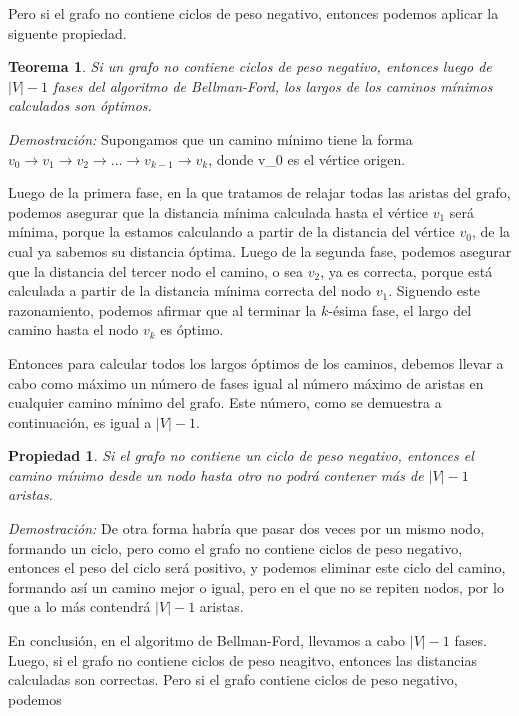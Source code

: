 \documentclass[a4paper, 10pt]{article}
\newcounter{theoremCounter}
\numberwithin{theoremCounter}{subsection}
\numberwithin{problemCounter}{subsection}
\numberwithin{defCounter}{subsection}
\numberwithin{obsCounter}{subsection}
\numberwithin{methCounter}{subsection}
\numberwithin{exampleCounter}{subsection}
\newcounter{propCounter}
\numberwithin{propCounter}{subsection}
\theoremstyle{violetnumbox}
\newtheorem{theoremeT}[theoremCounter]{Teorema}
\theoremstyle{blacknumex}
\newtheorem{propertyT}[propCounter]{Propiedad}
\newenvironment{theorem}{\begin{tBox}\begin{theoremeT}}{\end{theoremeT}\end{tBox}}
\newenvironment{property}{\begin{dBox}\begin{propertyT}}{\end{propertyT}\end{dBox}}
\begin{document}
\begin{multicols}{2}
    Pero si el grafo no contiene ciclos de peso negativo, entonces podemos aplicar la siguente propiedad.

    \begin{theorem}
        Si un grafo no contiene ciclos de peso negativo, entonces luego de $|V|-1$ fases del algoritmo de Bellman-Ford, los largos de los caminos m\'inimos calculados son \'optimos.
    \end{theorem}

    \textit{Demostraci\'on:} Supongamos que un camino m\'inimo tiene la forma $v_0 \rightarrow v_1 \rightarrow v_2 \rightarrow \ldots \rightarrow v_{k-1} \rightarrow v_k$, donde v_0 es el v\'ertice origen.

    Luego de la primera fase, en la que tratamos de relajar todas las aristas del grafo, podemos asegurar que la distancia m\'inima calculada hasta el v\'ertice $v_1$ ser\'a m\'inima, porque la estamos calculando a partir de la distancia del v\'ertice $v_0$, de la cual ya sabemos su distancia \'optima. Luego de la segunda fase, podemos asegurar que la distancia del tercer nodo el camino, o sea $v_2$, ya es correcta, porque est\'a calculada a partir de la distancia m\'inima correcta del nodo $v_1$. Siguendo este razonamiento, podemos afirmar que al terminar la $k$-\'esima fase, el largo del camino hasta el nodo $v_k$ es \'optimo.

    Entonces para calcular todos los largos \'optimos de los caminos, debemos llevar a cabo como m\'aximo un n\'umero de fases igual al n\'umero m\'aximo de aristas en cualquier camino m\'inimo del grafo. Este n\'umero, como se demuestra a continuaci\'on, es igual a $|V| - 1$. \blacksquare

    \begin{property}
        Si el grafo no contiene un ciclo de peso negativo, entonces el camino m\'inimo desde un nodo hasta otro no podr\'a contener m\'as de $|V|-1$ aristas.
    \end{property}
    \textit{Demostraci\'on:} De otra forma habr\'ia que pasar dos veces por un mismo nodo, formando un ciclo, pero como el grafo no contiene ciclos de peso negativo, entonces el peso del ciclo ser\'a positivo, y podemos eliminar este ciclo del camino, formando as\'i un camino mejor o igual, pero en el que no se repiten nodos, por lo que a lo m\'as contendr\'a $|V|-1$ aristas. \blacksquare

    En conclusi\'on, en el algoritmo de Bellman-Ford, llevamos a cabo $|V|-1$ fases. Luego, si el grafo no contiene ciclos de peso neagitvo, entonces las distancias calculadas son correctas. Pero si el grafo contiene ciclos de peso negativo, podemos








\end{multicols}
\end{document}

